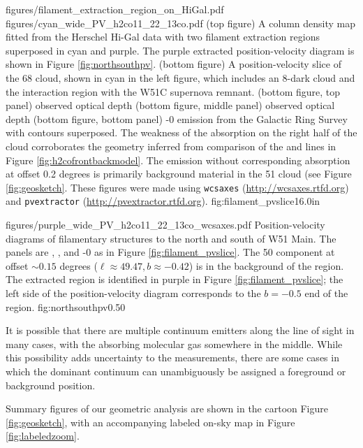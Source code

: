 \FigureTwoAA
{figures/filament_extraction_region_on_HiGal.pdf}
{figures/cyan_wide_PV_h2co11_22_13co.pdf}
{(top figure) A column density map fitted from the Herschel Hi-Gal data with two
filament extraction regions superposed in cyan and purple.
The purple extracted position-velocity diagram is shown in Figure
\ref{fig:northsouthpv}.
(bottom figure) A position-velocity slice of the 68 \kms cloud, shown in cyan in the
left figure, which includes an 8\um-dark cloud and the interaction region
with the W51C supernova remnant.
(bottom figure, top panel) \formaldehyde \oneone observed optical depth
(bottom figure, middle panel) \formaldehyde \twotwo observed optical depth
(bottom figure, bottom panel) -0 emission from the Galactic Ring Survey
\citep[GRS][]{Jackson2006a} with \formaldehyde \oneone
contours superposed.  The weakness of the \formaldehyde absorption on the right
half of the cloud corroborates the geometry inferred from comparison of the \oneone
and \twotwo lines in Figure \ref{fig:h2cofrontbackmodel}.
The \thirteenco emission without corresponding \formaldehyde absorption at offset
0.2 degrees is primarily background material in the 51 \kms cloud (see Figure
\ref{fig:geosketch}.
These figures were made using \texttt{wcsaxes} (\protect\url{http://wcsaxes.rtfd.org})
and \texttt{pvextractor} (\protect\url{http://pvextractor.rtfd.org}).
}
{fig:filament_pvslice}{1}{6.0in}


\Figure
{figures/purple_wide_PV_h2co11_22_13co_wcsaxes.pdf}
{Position-velocity diagrams of filamentary structures to the north and south of
W51 Main. The panels are \formaldehyde \oneone, \twotwo, and -0 as in Figure \ref{fig:filament_pvslice}.  The 50 \kms component at offset
$\sim0.15$ degrees ($\ell\approx49.47, b\approx-0.42$) is in the background of
the \hii region.  The extracted region is identified in purple in Figure
\ref{fig:filament_pvslice}; the left side of the position-velocity diagram
corresponds to the $b=-0.5$ end of the region.}
{fig:northsouthpv}{0.5}{0}

It is possible that there are multiple continuum emitters along the line of
sight in many cases, with the absorbing molecular gas somewhere in the middle.
While this possibility adds uncertainty to the measurements, there are some
cases in which the dominant continuum can unambiguously be assigned a
foreground or background position.

Summary figures of our geometric analysis are shown in the cartoon Figure
\ref{fig:geosketch}, with an accompanying labeled on-sky map in Figure
\ref{fig:labeledzoom}.

